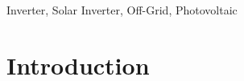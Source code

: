 \documentclass[journal]{IEEEtran}
\begin{document}







					      \maketitle


					      \begin{abstract}
					      \blindtext[1]
					      \end{abstract}

					      \begin{IEEEkeywords}
					      Inverter, Solar Inverter, Off-Grid, Photovoltaic
					      \end{IEEEkeywords}

					      \IEEEpeerreviewmaketitle



					      \section{Introduction}
\end{document}
